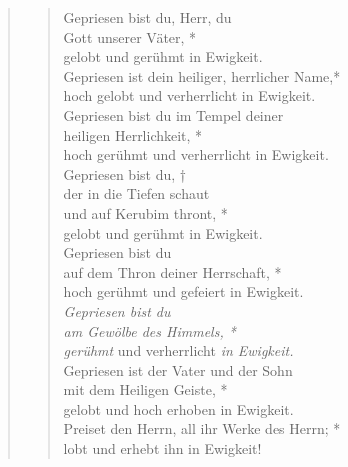 \begin{quote}
\begin{verse}
Gepriesen bist du, Herr, du\\
Gott unserer Väter, *\\
gelobt und gerühmt in Ewigkeit.\\
\vin Gepriesen ist dein heiliger, herrlicher Name,*\\
\vin hoch gelobt und verherrlicht in Ewigkeit.\\
Gepriesen bist du im Tempel deiner \\
heiligen Herrlichkeit, *\\
hoch gerühmt und verherrlicht in Ewigkeit.\\
\vin Gepriesen bist du, †\\
\vin der in die Tiefen schaut \\
\vin und auf Kerubim thront, *\\
\vin gelobt und gerühmt in Ewigkeit.\\
Gepriesen bist du \\
auf dem Thron deiner Herrschaft, *\\
hoch gerühmt und gefeiert in Ewigkeit.\\
\vin \textit{Gepriesen bist du\\ 
\vin am Gewölbe des Himmels, *\\
\vin gerühmt} und verherrlicht \textit{in Ewigkeit.}\\
Gepriesen ist der Vater und der Sohn\\
mit dem Heiligen Geiste, *\\
gelobt und hoch erhoben in Ewigkeit.\\
\vin Preiset den Herrn, all ihr Werke des Herrn; *\\
\vin lobt und erhebt ihn in Ewigkeit!\\

\end{verse}
\end{quote}

\vspace{0.6cm}

\def\greinitialformat#1{{\fontsize{40}{40}\selectfont #1}}
\gresetfirstlineaboveinitial{\small \textcolor{red}{Ps 148}}{}
\setaboveinitialseparation{0.72mm}




